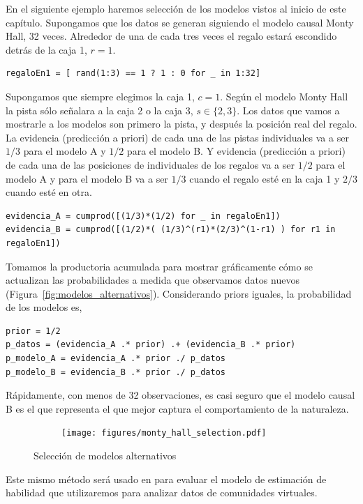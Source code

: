 \documentclass[a4paper,11pt]{book}
\theoremstyle{definition}
\begin{document}
En el siguiente ejemplo haremos selecci\'on de los modelos vistos al inicio de este cap\'itulo.
%
Supongamos que los datos se generan siguiendo el modelo causal Monty Hall, 32 veces.
%
Alrededor de una de cada tres veces el regalo estar\'a escondido detr\'as de la caja 1, $r=1$.
%
\begin{lstlisting}[backgroundcolor=\color{all}]
regaloEn1 = [ rand(1:3) == 1 ? 1 : 0 for _ in 1:32]
\end{lstlisting}
%
Supongamos que siempre elegimos la caja 1, $c=1$.
%
Seg\'un el modelo Monty Hall la pista s\'olo se\~nalara a la caja 2 o la caja 3, $s \in \{2,3\}$.
%
Los datos que vamos a mostrarle a los modelos son primero la pista, y despu\'es la posici\'on real del regalo.
%
La evidencia (predicci\'on a priori) de cada una de las pistas individuales va a ser $1/3$ para el modelo A y $1/2$ para el modelo B.
%
Y evidencia (predicci\'on a priori) de cada una de las posiciones de individuales de los regalos va a ser $1/2$ para el modelo A y para el modelo B va a ser $1/3$ cuando el regalo est\'e en la caja 1 y $2/3$ cuando est\'e en otra.
%
\begin{lstlisting}[backgroundcolor=\color{all}]
evidencia_A = cumprod([(1/3)*(1/2) for _ in regaloEn1])
evidencia_B = cumprod([(1/2)*( (1/3)^(r1)*(2/3)^(1-r1) ) for r1 in regaloEn1])
\end{lstlisting}
%
Tomamos la productoria acumulada para mostrar gr\'aficamente c\'omo se actualizan las probabilidades a medida que observamos datos nuevos (Figura~\ref{fig:modelos_alternativos}).
%
Considerando priors iguales, la probabilidad de los modelos es,
%
\begin{lstlisting}[backgroundcolor=\color{all}]
prior = 1/2
p_datos = (evidencia_A .* prior) .+ (evidencia_B .* prior)
p_modelo_A = evidencia_A .* prior ./ p_datos
p_modelo_B = evidencia_B .* prior ./ p_datos
\end{lstlisting}
%
R\'apidamente, con menos de 32 observaciones, es casi seguro que el modelo causal B es el que representa el que mejor captura el comportamiento de la naturaleza.
%
\begin{figure}[H]
    \centering
    \begin{subfigure}[b]{0.5\textwidth}
    \texttt{[image: figures/monty\_hall\_selection.pdf]}
    \end{subfigure}
    \caption{
    Selecci\'on de modelos alternativos
    }
    \label{fig:estrategias_individuales}
\end{figure}
%
Este mismo m\'etodo ser\'a usado en para evaluar el modelo de estimaci\'on de habilidad que utilizaremos para analizar datos de comunidades virtuales.
\end{document}
